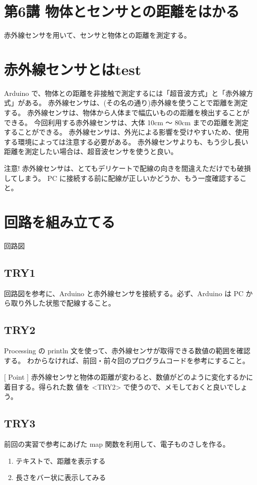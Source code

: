 \documentclass[11pt,a4paper]{jarticle}
\begin{document}
\section*{\LARGE{第6講 物体とセンサとの距離をはかる}}
赤外線センサを用いて、センサと物体との距離を測定する。


\section{赤外線センサとはtest}
Arduino で、物体との距離を非接触で測定するには「超音波方式」と「赤外線方式」がある。
赤外線センサは、(その名の通り)赤外線を使うことで距離を測定する。
赤外線センサは、物体から人体まで幅広いものの距離を検出することができる。
今回利用する赤外線センサは、大体 10cm 〜 80cm までの距離を測定することができる。
赤外線センサは、外光による影響を受けやすいため、使用する環境によっては注意する必要がある。
赤外線センサよりも、もう少し長い距離を測定したい場合は、超音波センサを使うと良い。

\begin{itembox}{注意!}
 赤外線センサは、とてもデリケートで配線の向きを間違えただけでも破損してしまう。
 PC に接続する前に配線が正しいかどうか、もう一度確認すること。
\end{itembox}

\section{回路を組み立てる}

回路図

\subsection*{TRY1}
回路図を参考に、Arduino と赤外線センサを接続する。必ず、Arduino は PC から取り外した状態で配線すること。

\subsection*{TRY2}
Processing の println 文を使って、赤外線センサが取得できる数値の範囲を確認する。
わからなければ、前回・前々回のプログラムコードを参考にすること。

[ Point ]
 赤外線センサと物体の距離が変わると、数値がどのように変化するかに着目する。得られた数
値を <TRY2> で使うので、メモしておくと良いでしょう。

\subsection*{TRY3}
前回の実習で参考にあげた map 関数を利用して、電子ものさしを作る。
\begin{enumerate}
 \item テキストで、距離を表示する
 \item 長さをバー状に表示してみる
\end{enumerate}
\end{document}
